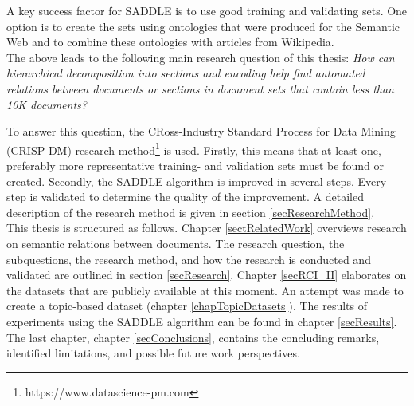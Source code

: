 A key success factor for SADDLE is to use good training and validating sets. One option is to create the sets using ontologies that were produced for the Semantic Web and to combine these ontologies with articles from Wikipedia.\\

The above leads to the following main research question of this thesis: \textit{How can hierarchical decomposition into sections and encoding help find automated relations between documents or sections in document sets that contain less than 10K documents?}

To answer this question, the CRoss-Industry Standard Process for Data Mining (CRISP-DM) research method\footnote{https://www.datascience-pm.com} is used. Firstly, this means that at least one, preferably more representative training- and validation sets must be found or created. Secondly, the SADDLE algorithm is improved in several steps. Every step is validated to determine the quality of the improvement. A detailed description of the research method is given in section \ref{secResearchMethod}.  \\

This thesis is structured as follows. Chapter \ref{sectRelatedWork} overviews research on semantic relations between documents. The research question, the subquestions, the research method, and how the research is conducted and validated are outlined in section \ref{secResearch}. Chapter \ref{secRCI_II} elaborates on the datasets that are publicly available at this moment. An attempt was made to create a topic-based dataset (chapter \ref{chapTopicDatasets}). The results of experiments using the SADDLE algorithm can be found in chapter \ref{secResults}. The last chapter, chapter \ref{secConclusions}, contains the concluding remarks, identified limitations, and possible future work perspectives.

